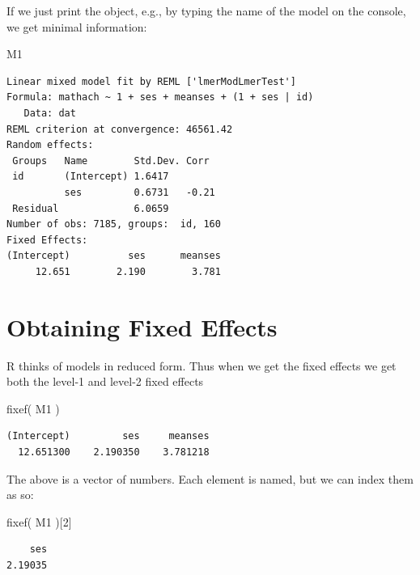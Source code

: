 \documentclass[
  letterpaper,
  DIV=11,
  numbers=noendperiod]{scrreprt}
\newenvironment{Shaded}{\begin{snugshade}}{\end{snugshade}}
\newcommand{\DecValTok}[1]{\textcolor[rgb]{0.25,0.63,0.44}{#1}}
\newcommand{\FunctionTok}[1]{\textcolor[rgb]{0.02,0.16,0.49}{#1}}
\newcommand{\NormalTok}[1]{\textcolor[rgb]{0.00,0.44,0.13}{#1}}
\begin{document}
If we just print the object, e.g., by typing the name of the model on
the console, we get minimal information:

\begin{Shaded}
\begin{Highlighting}[]
\NormalTok{M1}
\end{Highlighting}
\end{Shaded}

\begin{verbatim}
Linear mixed model fit by REML ['lmerModLmerTest']
Formula: mathach ~ 1 + ses + meanses + (1 + ses | id)
   Data: dat
REML criterion at convergence: 46561.42
Random effects:
 Groups   Name        Std.Dev. Corr 
 id       (Intercept) 1.6417        
          ses         0.6731   -0.21
 Residual             6.0659        
Number of obs: 7185, groups:  id, 160
Fixed Effects:
(Intercept)          ses      meanses  
     12.651        2.190        3.781  
\end{verbatim}

\hypertarget{obtaining-fixed-effects-1}{%
\section{Obtaining Fixed Effects}\label{obtaining-fixed-effects-1}}

R thinks of models in reduced form. Thus when we get the fixed effects
we get both the level-1 and level-2 fixed effects

\begin{Shaded}
\begin{Highlighting}[]
\FunctionTok{fixef}\NormalTok{( M1 )}
\end{Highlighting}
\end{Shaded}

\begin{verbatim}
(Intercept)         ses     meanses 
  12.651300    2.190350    3.781218 
\end{verbatim}

The above is a vector of numbers. Each element is named, but we can
index them as so:

\begin{Shaded}
\begin{Highlighting}[]
\FunctionTok{fixef}\NormalTok{( M1 )[}\DecValTok{2}\NormalTok{]}
\end{Highlighting}
\end{Shaded}

\begin{verbatim}
    ses 
2.19035 
\end{verbatim}
\end{document}
